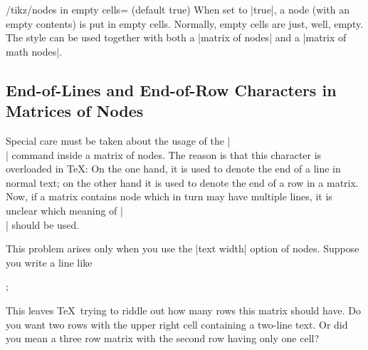\begin{key}{/tikz/nodes in empty cells= (default true)}
  When set to |true|, a node (with an empty contents) is put in empty
  cells. Normally, empty cells are just, well, empty. The style can be
  used together with both a |matrix of nodes| and a
  |matrix of math nodes|.
\begin{codeexample}[]
\end{codeexample}
\begin{codeexample}[]
\end{codeexample}
\end{key}


\subsection{End-of-Lines and End-of-Row Characters in Matrices of Nodes}

Special care must be taken about the usage of the |\\| command inside
a matrix of nodes. The reason is that this character is overloaded in
\TeX: On the one hand, it is used to denote the end of a line in
normal text; on the other hand it is used to denote the end of a row
in a matrix. Now, if a matrix contains node which in turn may have
multiple lines, it is unclear which meaning of |\\| should be used.

This problem arises only when you use the |text width| option of
nodes. Suppose you write a line like
\begin{codeexample}
;
\end{codeexample}
This leaves \TeX\ trying to riddle out how many rows this matrix
should have. Do you want two rows with the upper right cell containing
a two-line text. Or did you mean a three row matrix with the second
row having only one cell?

